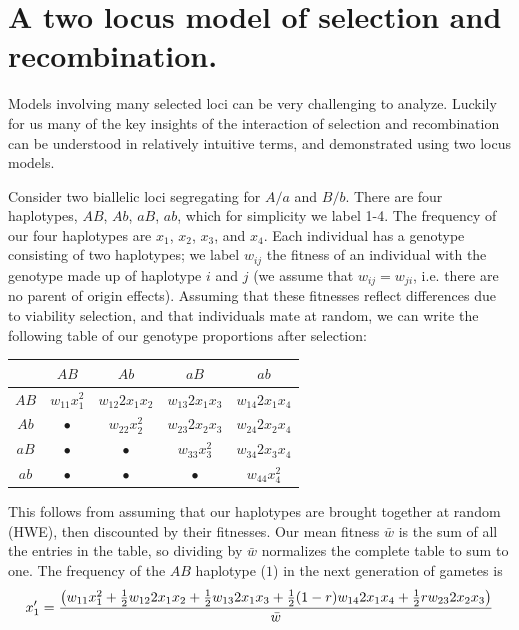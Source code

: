 \section{A two locus model of selection and recombination.}
Models involving many selected loci can be very challenging to analyze. Luckily for us many of the key insights of the interaction of selection and recombination can be understood in relatively intuitive terms, and demonstrated using two locus models. 

Consider two biallelic loci segregating for $A/a$ and $B/b$. There are four haplotypes, $AB$, $Ab$, $aB$, $ab$, which for simplicity we label 1-4. The frequency of our four haplotypes are $x_1$, $x_2$, $x_3$, and $x_4$. Each individual has a genotype consisting of two haplotypes; we label $w_{ij}$ the fitness of an individual with the genotype made up of haplotype $i$ and $j$ (we assume that $w_{ij}=w_{ji}$, i.e. there are no parent of origin effects). Assuming that these fitnesses reflect differences due to viability selection, and that individuals mate at random, we can write the following table of our genotype proportions after selection:\\
\begin{center}
\begin{tabular}{c|cccc}
         & $AB$			& $Ab$				& $aB$				& $ab$\\
\hline
$AB$ & $w_{11} x_1^2$ 	& $w_{12} 2 x_1 x_2$  	& $w_{13} 2 x_1 x_3$ 	& $w_{14} 2 x_1 x_4$ \\
$Ab$ & $\bullet$ 	  	& $w_{22} x_2^2$ 	  	& $w_{23} 2 x_2 x_3$  	& $w_{24} 2 x_2 x_4$ \\  
$aB$ & $\bullet$ 		& $\bullet$ 			& $w_{33} x_3^2$ 	  	& $w_{34} 2 x_3 x_4$ \\  
$ab$ & $\bullet$ 		& $\bullet$			& $\bullet$ 			&  $w_{44} x_4^2$ \\
\end{tabular}
\end{center}
This follows from assuming that our haplotypes are brought together at random (HWE), then discounted by their fitnesses. Our mean fitness $\bar{w}$ is the sum of all the entries in the table, so dividing by $\bar{w}$ normalizes the complete table to sum to one. The frequency of the $AB$ haplotype ($1$) in the next generation of gametes is
\begin{equation}
x_1' = \frac{\big( w_{11} x_1^2 +	 \tfrac{1}{2} w_{12} 2 x_1 x_2  + \tfrac{1}{2} w_{13} 2x_1 x_3  +	 \tfrac{1}{2} (1-r) w_{14} 2 x_1 x_4 + \tfrac{1}{2} r w_{23} 2 x_2 x_3   \big)}{ \bar{w} } \label{eqn:hapfreq}
\end{equation}
